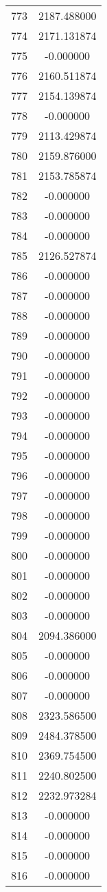 \documentclass[12pt]{article}
\begin{document}
\begin{longtable}{@{}cc@{}}
773 & 2187.488000 \\
774 & 2171.131874 \\
775 & -0.000000 \\
776 & 2160.511874 \\
777 & 2154.139874 \\
778 & -0.000000 \\
779 & 2113.429874 \\
780 & 2159.876000 \\
781 & 2153.785874 \\
782 & -0.000000 \\
783 & -0.000000 \\
784 & -0.000000 \\
785 & 2126.527874 \\
786 & -0.000000 \\
787 & -0.000000 \\
788 & -0.000000 \\
789 & -0.000000 \\
790 & -0.000000 \\
791 & -0.000000 \\
792 & -0.000000 \\
793 & -0.000000 \\
794 & -0.000000 \\
795 & -0.000000 \\
796 & -0.000000 \\
797 & -0.000000 \\
798 & -0.000000 \\
799 & -0.000000 \\
800 & -0.000000 \\
801 & -0.000000 \\
802 & -0.000000 \\
803 & -0.000000 \\
804 & 2094.386000 \\
805 & -0.000000 \\
806 & -0.000000 \\
807 & -0.000000 \\
808 & 2323.586500 \\
809 & 2484.378500 \\
810 & 2369.754500 \\
811 & 2240.802500 \\
812 & 2232.973284 \\
813 & -0.000000 \\
814 & -0.000000 \\
815 & -0.000000 \\
816 & -0.000000 \\

\end{longtable}
\end{document}

